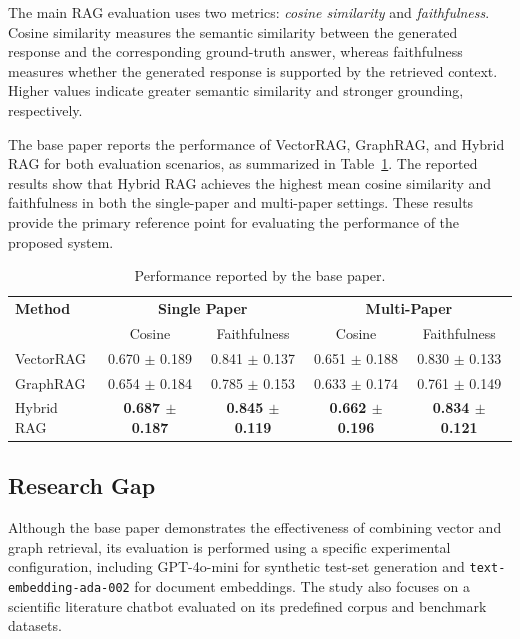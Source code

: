 \documentclass[conference]{IEEEtran}
\begin{document}
The main RAG evaluation uses two metrics: \textit{cosine similarity} and \textit{faithfulness}. Cosine similarity measures the semantic similarity between the generated response and the corresponding ground-truth answer, whereas faithfulness measures whether the generated response is supported by the retrieved context. Higher values indicate greater semantic similarity and stronger grounding, respectively. \cite{ghanadian2026base}

The base paper reports the performance of VectorRAG, GraphRAG, and Hybrid RAG for both evaluation scenarios, as summarized in Table~\ref{tab:baseresults}. The reported results show that Hybrid RAG achieves the highest mean cosine similarity and faithfulness in both the single-paper and multi-paper settings. These results provide the primary reference point for evaluating the performance of the proposed system.

\begin{table}[t]
\centering
\caption{Performance reported by the base paper.}
\label{tab:baseresults}
\begin{tabular}{lcccc}
\hline
\textbf{Method} &
\multicolumn{2}{c}{\textbf{Single Paper}} &
\multicolumn{2}{c}{\textbf{Multi-Paper}} \\
& Cosine & Faithfulness & Cosine & Faithfulness \\
\hline
VectorRAG &
0.670 $\pm$ 0.189 &
0.841 $\pm$ 0.137 &
0.651 $\pm$ 0.188 &
0.830 $\pm$ 0.133 \\
GraphRAG &
0.654 $\pm$ 0.184 &
0.785 $\pm$ 0.153 &
0.633 $\pm$ 0.174 &
0.761 $\pm$ 0.149 \\
Hybrid RAG &
\textbf{0.687 $\pm$ 0.187} &
\textbf{0.845 $\pm$ 0.119} &
\textbf{0.662 $\pm$ 0.196} &
\textbf{0.834 $\pm$ 0.121} \\
\hline
\end{tabular}
\end{table}

\subsection{Research Gap}

Although the base paper demonstrates the effectiveness of combining vector and graph retrieval, its evaluation is performed using a specific experimental configuration, including GPT-4o-mini for synthetic test-set generation and \texttt{text-embedding-ada-002} for document embeddings. The study also focuses on a scientific literature chatbot evaluated on its predefined corpus and benchmark datasets.
\end{document}
